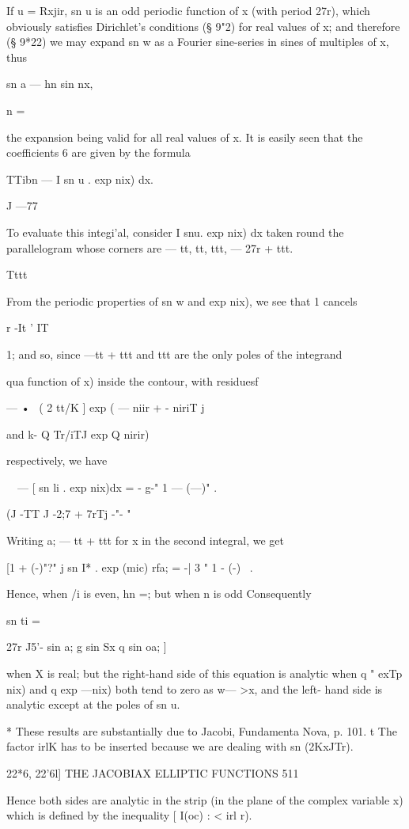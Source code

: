 If u = Rxjir, sn u is an odd periodic function of x (with period 27r),
which obviously satisfies Dirichlet's conditions (§ 9"2) for real
values of x; and therefore (§ 9*22) we may expand sn w as a Fourier
sine-series in sines of multiples of x, thus

sn a — hn sin nx,

n = \

the expansion being valid for all real values of x. It is easily seen
that the coefficients 6 are given by the formula

TTibn — I sn u . exp nix) dx.

J —77

To evaluate this integi'al, consider I snu. exp nix) dx taken round
the parallelogram whose corners are — tt, tt, ttt, — 27r + ttt.

Tttt

From the periodic properties of sn w and exp nix), we see that 1
cancels

r -It ' IT

1; and so, since —tt + ttt and ttt are the only poles of the
integrand

 qua function of x) inside the contour, with residuesf

— •~ ( 2 tt/K ] exp ( — niir + - niriT j

and k- Q Tr/iTJ exp Q nirir)

respectively, we have

\ \ — [ sn li . exp nix)dx = - g-" 1 — (—)" .

(J -TT J -2;7 + 7rTj -"- "

Writing a; — tt + ttt for x in the second integral, we get

[1 + (-)"?" j sn I* . exp (mic) rfa; = -| 3 " 1 - (-)~ .

Hence, when /i is even, hn =; but when n is odd Consequently

sn ti =

27r J5'- sin a; g sin Sx q sin oa; ]

when X is real; but the right-hand side of this equation is analytic
when q " exTp nix) and q exp —nix) both tend to zero as w— >x, and the
left- hand side is analytic except at the poles of sn u.

* These results are substantially due to Jacobi, Fundamenta Nova, p.
101. t The factor irlK has to be inserted because we are dealing with
sn (2KxJTr).

22*6, 22'6l] THE JACOBIAX ELLIPTIC FUNCTIONS 511

Hence both sides are analytic in the strip (in the plane of the
complex variable x) which is defined by the inequality [ I(oc) : < irl
r).

